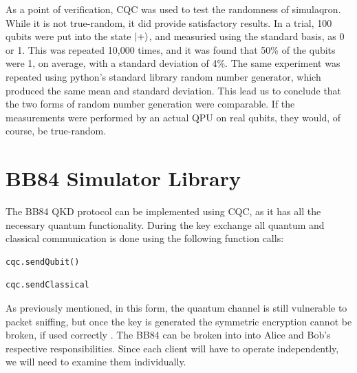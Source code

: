 \noindent
\begin{minipage}{\linewidth}
\begin{singlespace}

\end{singlespace}
\end{minipage}

As a point of verification, CQC was used to test the randomness of simulaqron.
While it is not true-random, it did provide satisfactory results.
In a trial, 100 qubits were put into the state $\ket{+}$, and measuried using the standard basis, as 0 or 1. This was repeated 10,000 times, and it was found that 50\% of the qubits were 1, on average, with a standard deviation of 4\%. 
The same experiment was repeated using python's standard library random number generator, which produced the same mean and standard deviation.
This lead us to conclude that the two forms of random number generation were comparable. If the measurements were performed by an actual QPU on real qubits, they would, of course, be true-random.


\section{BB84 Simulator Library}
The BB84 QKD protocol can be implemented using CQC, as it has all the necessary quantum functionality.
During the key exchange all quantum and classical communication is done using the following function calls:
\begin{verbatim}cqc.sendQubit()\end{verbatim}
\begin{verbatim}cqc.sendClassical\end{verbatim}
As previously mentioned, in this form, the quantum channel is still vulnerable to packet sniffing, but once the key is generated the symmetric encryption cannot be broken, if used correctly \cite{cryptography}.
The BB84 can be broken into into Alice and Bob's respective responsibilities.
Since each client will have to operate independently, we will need to examine them individually.

